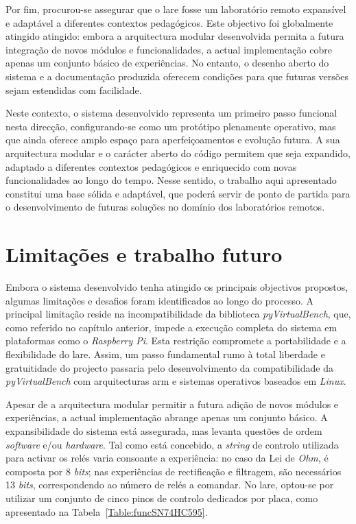 Por fim, procurou-se assegurar que o \acrshort{lare} fosse um laboratório remoto expansível e adaptável a diferentes contextos pedagógicos. Este objectivo foi globalmente atingido atingido: embora a arquitectura modular desenvolvida permita a futura integração de novos módulos e funcionalidades, a actual implementação cobre apenas um conjunto básico de experiências. No entanto, o desenho aberto do sistema e a documentação produzida oferecem condições para que futuras versões sejam estendidas com facilidade.

Neste contexto, o sistema desenvolvido representa um primeiro passo funcional nesta direcção, configurando-se como um protótipo plenamente operativo, mas que ainda oferece amplo espaço para aperfeiçoamentos e evolução futura. A sua arquitectura modular e o carácter aberto do código permitem que seja expandido, adaptado a diferentes contextos pedagógicos e enriquecido com novas funcionalidades ao longo do tempo. Nesse sentido, o trabalho aqui apresentado constitui uma base sólida e adaptável, que poderá servir de ponto de partida para o desenvolvimento de futuras soluções no domínio dos laboratórios remotos.

\section{Limitações e trabalho futuro}
\label{limitacoes}
Embora o sistema desenvolvido tenha atingido os principais objectivos propostos, algumas limitações e desafios foram identificados ao longo do processo. A principal limitação reside na incompatibilidade da biblioteca \textit{pyVirtualBench}, que, como referido no capítulo anterior, impede a execução completa do sistema em plataformas como o \textit{Raspberry Pi}. Esta restrição compromete a portabilidade e a flexibilidade do \acrshort{lare}. Assim, um passo fundamental rumo à total liberdade e gratuitidade do projecto passaria pelo desenvolvimento da compatibilidade da \textit{pyVirtualBench} com arquitecturas \acrshort{arm} e sistemas operativos baseados em \textit{Linux}.

Apesar de a arquitectura modular permitir a futura adição de novos módulos e experiências, a actual implementação abrange apenas um conjunto básico. A expansibilidade do sistema está assegurada, mas levanta questões de ordem \textit{software} e/ou \textit{hardware}. Tal como está concebido, a \textit{string} de controlo utilizada para activar os relés varia consoante a experiência: no caso da Lei de \textit{Ohm}, é composta por 8 \textit{bits}; nas experiências de rectificação e filtragem, são necessários 13 \textit{bits}, correspondendo ao número de relés a comandar. No \acrshort{lare}, optou-se por utilizar um conjunto de cinco pinos de controlo dedicados por placa, como apresentado na Tabela~\ref{Table:funcSN74HC595}.

